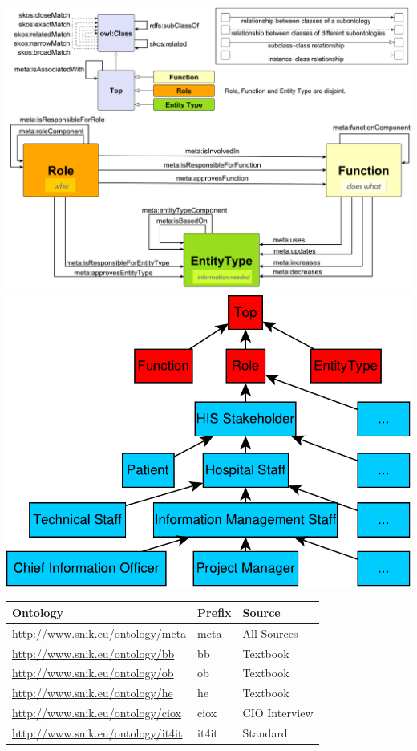\documentclass[sw]{iosart2x}
\begin{document}
\includegraphics[width=\columnwidth]{img/metamodel9s.pdf}
\includegraphics[width=\columnwidth]{img/hierarchy.pdf}
\begin{center}
\begin{tabular*}{0.96\columnwidth}{lll}
\toprule
\textbf{Ontology}				&\textbf{Prefix}&\textbf{Source}\\
\midrule
\url{http://www.snik.eu/ontology/meta}		&meta		&All Sources\\
\url{http://www.snik.eu/ontology/bb}		&bb		&Textbook~\cite{bb}\\
\url{http://www.snik.eu/ontology/ob}		&ob		&Textbook~\cite{ob}\\
\url{http://www.snik.eu/ontology/he}		&he		&Textbook~\cite{he}\\
\url{http://www.snik.eu/ontology/ciox}		&ciox		&CIO Interview\\
\url{http://www.snik.eu/ontology/it4it}		&it4it		&Standard~\cite{it4it}\\
\bottomrule
\end{tabular*}
\end{center}
\end{document}
